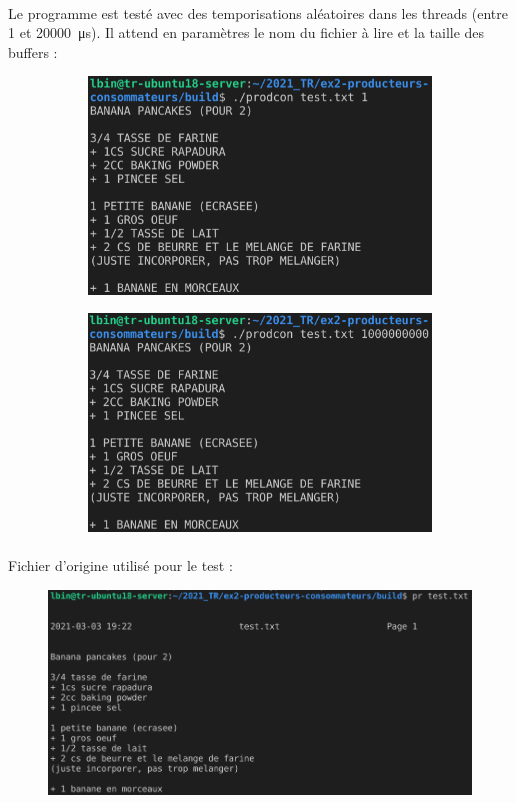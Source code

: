 \documentclass{article}
\begin{document}
    \paragraph{}
    Le programme est testé avec des temporisations aléatoires dans les threads (entre 1 et \SI{20000}{\micro\second}). Il attend en paramètres le nom du fichier à lire et la taille des buffers :
    \begin{figure}[H]
        \centering
        \begin{subfigure}[b]{.48\textwidth}
            \centering
            \includegraphics[width=\textwidth]{./screenshots/test1.png}
        \end{subfigure}
        \begin{subfigure}[b]{.48\textwidth}
            \centering
            \includegraphics[width=\textwidth]{./screenshots/test1000000000.png}
        \end{subfigure}
    \end{figure}

    \paragraph{}
    Fichier d'origine utilisé pour le test :
    \begin{figure}[H]
        \centering
        \includegraphics[width=.8\textwidth]{./screenshots/test_text.png}
    \end{figure}
\end{document}
